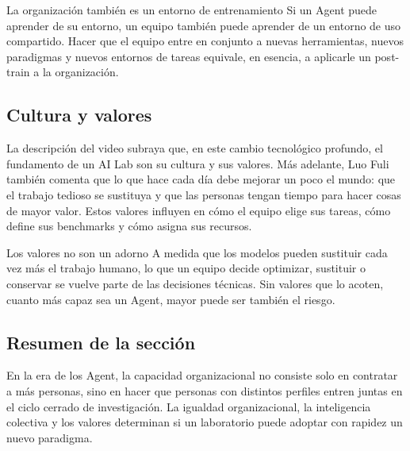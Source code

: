 \begin{importantbox}{La organización también es un entorno de entrenamiento}
Si un Agent puede aprender de su entorno, un equipo también puede aprender de un entorno de uso compartido. Hacer que el equipo entre en conjunto a nuevas herramientas, nuevos paradigmas y nuevos entornos de tareas equivale, en esencia, a aplicarle un post-train a la organización.
\end{importantbox}

\subsection{Cultura y valores}

La descripción del video subraya que, en este cambio tecnológico profundo, el fundamento de un AI Lab son su cultura y sus valores. Más adelante, Luo Fuli también comenta que lo que hace cada día debe mejorar un poco el mundo: que el trabajo tedioso se sustituya y que las personas tengan tiempo para hacer cosas de mayor valor. Estos valores influyen en cómo el equipo elige sus tareas, cómo define sus benchmarks y cómo asigna sus recursos.

\begin{warningbox}{Los valores no son un adorno}
A medida que los modelos pueden sustituir cada vez más el trabajo humano, lo que un equipo decide optimizar, sustituir o conservar se vuelve parte de las decisiones técnicas. Sin valores que lo acoten, cuanto más capaz sea un Agent, mayor puede ser también el riesgo.
\end{warningbox}

\subsection{Resumen de la sección}

En la era de los Agent, la capacidad organizacional no consiste solo en contratar a más personas, sino en hacer que personas con distintos perfiles entren juntas en el ciclo cerrado de investigación. La igualdad organizacional, la inteligencia colectiva y los valores determinan si un laboratorio puede adoptar con rapidez un nuevo paradigma.
